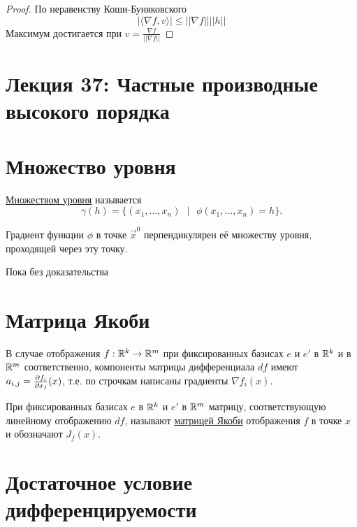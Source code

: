     \begin{proof}
    	По неравенству Коши-Буняковского
    	\[ |\langle \nabla f, v \rangle| \leqslant ||\nabla f|| ||h|| \]
    	Максимум достигается при $v = \frac{\nabla f}{||\nabla f||}$
    \end{proof}
    
    \newpage
    
    \section*{Лекция 37: Частные производные высокого порядка}
    
    \section{Множество уровня}
    
    \begin{definition}
    	\underline{Множеством уровня} называется
    	\[ \gamma(h) = \{(x_1, ..., x_n) \text{ } | \text{ } \phi(x_1, ..., x_n) = h\}. \]
    \end{definition}
    
    \begin{sentence}
    	Градиент функции $\phi$ в точке $\vec{x}^0$ перпендикулярен её множеству уровня, проходящей через эту точку.
    \end{sentence}
    
    Пока без доказательства
    
    \section{Матрица Якоби}
    
    \begin{mention}
    	В случае отображения $f : \mathbb R^k \rightarrow \mathbb R^m$ при фиксированных базисах $e$ и $e'$ в $\mathbb R^k$ и в $\mathbb R^m$ соответственно, компоненты матрицы дифференциала $df$ имеют $a_{i, j} = \frac{\partial f_i}{\partial x_j} (x)$, т.е. по строчкам написаны градиенты $\nabla f_i(x).$
    \end{mention}
    
    \begin{definition}
    	При фиксированных базисах $e$ в $\mathbb R^k$ и $e'$ в $\mathbb R^m$ матрицу, соответствующую линейному отображению $df$, называют \underline{матрицей Якоби} отображения $f$ в точке $x$ и обозначают $J_f (x)$.
    \end{definition}
    
    \section{Достаточное условие дифференцируемости}
    
